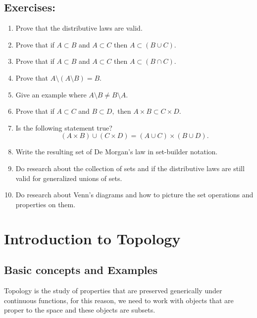 \documentclass[
	fontsize=10pt, %
	twoside=false, %
	secnumdepth=1, %
]{kaobook}
\begin{document}
\section{Exercises:}

\begin{enumerate}
\item Prove that the distributive laws are valid. 

\item Prove that if $A\subset B$ and $A\subset C$ then $A\subset (B\cup C).$

\item Prove that if $A\subset B$ and $A\subset C$ then $A\subset (B\cap C).$

\item Prove that $A\setminus (A\setminus B)= B.$

\item Give an example where $A\setminus B \neq B\setminus A.$

\item Prove that if $A\subset C$ and $B\subset D,$ then $A\times B \subset C\times D.$

\item Is the following statement true? $$(A\times B)\cup (C\times D)=(A\cup C)\times (B\cup D).$$

\item Write the resulting set of De Morgan's law in set-builder notation.

\item Do research about the collection of sets and if the distributive laws are still valid for generalized unions of sets.

\item Do research about Venn's diagrams and how to picture the set operations and properties on them.
\end{enumerate}
\chapter{Introduction to Topology}



\section{Basic concepts and Examples}

Topology is the study of properties that are preserved generically under continuous functions, for this reason, we need to work with objects that are proper to the space and these objects are subsets.
\end{document}
